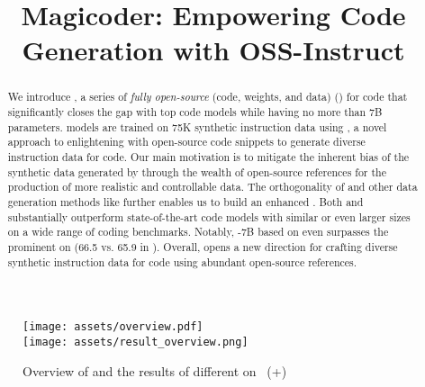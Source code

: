 \title{Magicoder: Empowering Code Generation with OSS-Instruct}





\begin{abstract}
We introduce \model{}, a series of \emph{fully open-source} (code, weights, and data)  () for code 
that significantly closes the gap with top code models while having no more than 7B parameters. 
\model{} models are trained on 75K synthetic instruction data using \tech,
a novel approach to enlightening  with open-source code snippets to generate diverse instruction data for code.
Our main motivation is to mitigate the inherent bias of
{the synthetic data generated by } through the wealth of open-source references for the production of more realistic and controllable data.
The orthogonality of \tech{} and other data generation methods like \evolinstruct{} further enables us to build an enhanced \modelx{}.
Both \model{} and \modelx{} substantially outperform state-of-the-art code models with similar or even larger sizes on a wide range of coding benchmarks.
Notably, \modelxc-7B based on \codellama{} even surpasses the
{prominent} \chatgpt{} on
{\humanevalp{}}
(66.5 vs. 65.9 in ).
Overall, \tech{} opens a new direction for
crafting diverse synthetic instruction data for code using abundant open-source references.

\end{abstract}
\begin{figure*}[ht]
\centering
\texttt{[image: assets/overview.pdf]}\\[8pt]%
\texttt{[image: assets/result\_overview.png]}
\caption{Overview of \tech{} and the  results of different  on \humaneval~(+)}
\label{fig:overview}
\end{figure*}

